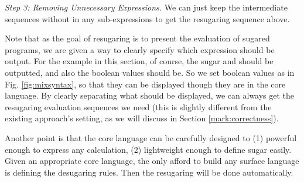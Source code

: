 {\em Step 3: Removing Unnecessary Expressions.}
We can just keep the intermediate sequences without  in any sub-expressions to get the resugaring sequence above.

Note that as the goal of resugaring is to present the evaluation of sugared programs, we are given a way to clearly specify which expression should be output. For the example in this section, of course, the sugar  and  should be outputted, and also the boolean values should be. So we set boolean values as  in Fig. \ref{fig:mixsyntax}, so that they can be displayed though they are in the core language. By clearly separating what should be displayed, we can always get the resugaring evaluation sequences we need (this is slightly different from the existing approach's setting, as we will discuss in Section \ref{mark:correctness}).

Another point is that the core language can be carefully designed to (1) powerful enough to express any calculation, (2) lightweight enough to define sugar easily. Given an appropriate core language, the only afford to build any surface language is defining the desugaring rules. Then the resugaring will be done automatically.